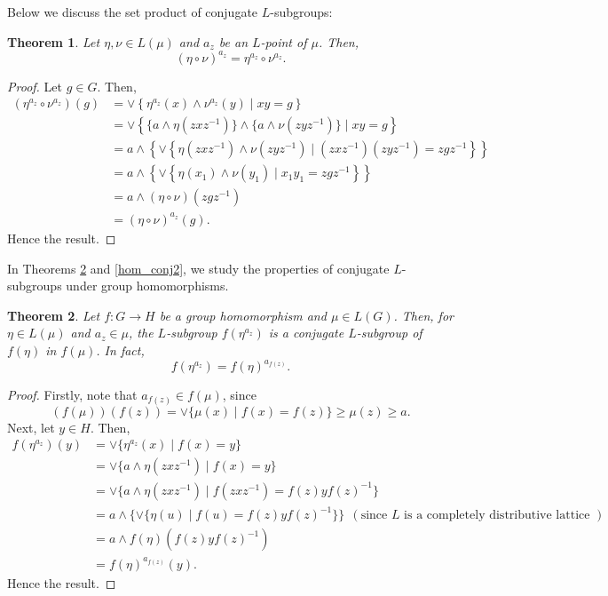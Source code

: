 \documentclass[10pt]{article}
\theoremstyle{plain}
\newtheorem{theorem}{Theorem}[section]
\theoremstyle{definition}
\theoremstyle{remark}
\theoremstyle{case}
\begin{document}
\vspace{.2cm}
\noindent Below we discuss the set product of conjugate $L$-subgroups:
\begin{theorem}
	Let $\eta, \nu \in L(\mu)$ and $a_z$ be an $L$-point of $\mu$. Then, 
	\[ (\eta \circ \nu)^{a_z} = \eta^{a_z} \circ \nu^{a_z}. \]
\end{theorem}
\begin{proof}
	Let $g \in G$. Then,
	\begin{equation*}
	\begin{split}
		(\eta^{a_z} \circ \nu^{a_z})(g) &= \vee \left\{\eta^{a_z}(x) \wedge \nu^{a_z}(y) \mid xy = g \right\} \\
			&= \vee \left\{ \{ a \wedge \eta(zxz^{-1}) \} \wedge \{ a \wedge \nu(zyz^{-1})\} \mid xy=g \right\} \\
			&= a \wedge \left\{ \vee \left\{ \eta(zxz^{-1}) \wedge \nu(zyz^{-1}) \mid (zxz^{-1})(zyz^{-1}) = zgz^{-1} \right\} \right\} \\
			&= a \wedge \left\{ \vee \left\{ \eta(x_1) \wedge \nu(y_1) \mid x_1y_1 = zgz^{-1} \right\} \right\} \\
			&= a \wedge (\eta \circ \nu)(zgz^{-1}) \\
			&= (\eta \circ \nu)^{a_z}(g).			
	\end{split}
	\end{equation*}
	Hence the result.
\end{proof}

\noindent In Theorems \ref{hom_conj1} and \ref{hom_conj2}, we study the properties of conjugate $L$-subgroups under group homomorphisms.

\begin{theorem}\label{hom_conj1}
	Let $f : G \rightarrow H$ be a group homomorphism and $\mu \in L(G)$. Then, for $\eta \in L(\mu)$ and $a_z \in \mu$, the $L$-subgroup $f(\eta^{a_z})$ is a conjugate $L$-subgroup of $f(\eta)$ in $f(\mu)$. In fact, 
	\[ f(\eta^{a_z}) = f(\eta)^{a_{f(z)}}. \]
\end{theorem}
\begin{proof}
	Firstly, note that $a_{f(z)} \in f(\mu)$, since
	\[ (f(\mu))(f(z)) = \vee\{ \mu(x) \mid f(x) = f(z) \} \geq \mu(z) \geq a. \] 
	Next, let $y \in H$. Then,
	\begin{equation*}
		\begin{split}
			f(\eta^{a_z})(y) &= \vee \{ \eta^{a_z}(x) \mid f(x) = y \} \\
			&= \vee \{ a \wedge \eta(zxz^{-1}) \mid f(x) = y \} \\
			&= \vee \{ a \wedge \eta(zxz^{-1}) \mid f(zxz^{-1}) = f(z)yf(z)^{-1} \}\\
			&= a \wedge \{\vee \{ \eta(u) \mid f(u) = f(z)yf(z)^{-1} \} \}~~(\text{since~} L \text{~is a completely distributive lattice~}) \\
			&= a \wedge f(\eta)(f(z)yf(z)^{-1}) \\
			&= f(\eta)^{a_{f(z)}}(y).
		\end{split}
	\end{equation*}
	Hence the result.
\end{proof}
\end{document}
